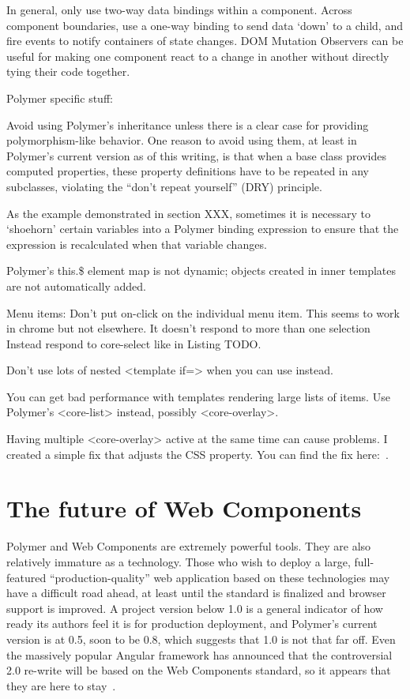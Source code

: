 In general, only use two-way data bindings within a component.
Across component boundaries, use a one-way binding to send data `down' to a child,
and fire events to notify containers of state changes.
DOM Mutation Observers can be useful for making one component react to a change in another without directly tying their code together.


Polymer specific stuff:


Avoid using Polymer's inheritance unless there is a clear case for providing polymorphism-like behavior.
One reason to avoid using them, at least in Polymer's current version as of this writing, is that when a base class provides computed properties, 
these property definitions have to be repeated in any subclasses, 
violating the ``don't repeat yourself'' (DRY) principle.

As the  example demonstrated in section XXX, 
sometimes it is necessary to `shoehorn' certain variables into a Polymer binding expression 
to ensure that the expression is recalculated when that variable changes.

Polymer's this.\$ element map is not dynamic; objects created in inner templates are not automatically added.

Menu items:
Don't put on-click on the individual menu item. This seems to work in chrome but not elsewhere. It doesn't respond to more than one selection
Instead respond to core-select like in Listing TODO.

Don't use lots of nested <template if=> when you can use  instead.

You can get bad performance with templates rendering large lists of items. Use Polymer's <core-list> instead, possibly <core-overlay>.

Having multiple <core-overlay> active at the same time can cause problems. I created a simple fix that adjusts the CSS  property. 
You can find the fix here:~\cite{landers2015-d}.


\section{The future of Web Components}

Polymer and Web Components are extremely powerful tools.
They are also relatively immature as a technology.
Those who wish to deploy a large, full-featured ``prod\-uction-quality'' web application based on these technologies may have a difficult road ahead, 
at least until the standard is finalized and browser support is improved.
A project version below 1.0 is a general indicator of how ready its authors feel it is for production deployment, and Polymer's current version is at 0.5, soon to be 0.8, 
which suggests that 1.0 is not that far off.
Even the massively popular Angular framework has announced that the controversial 2.0 re-write will be based on the Web Components standard,
so it appears that they are here to stay~\cite{santiagoesteva2015}.

